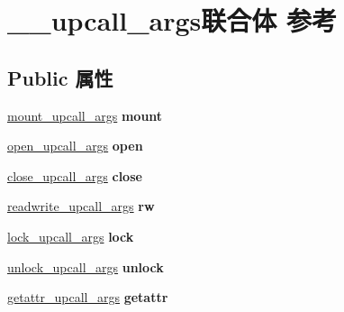 \hypertarget{union____upcall__args}{}\section{\+\_\+\+\_\+upcall\+\_\+args联合体 参考}
\label{union____upcall__args}
\subsection*{Public 属性}
\begin{DoxyCompactItemize}
\item 
\mbox{\label{union____upcall__args_a2414553dc8fd0a868d00a6451d0d7c68}} 
\hyperlink{struct____mount__upcall__args}{mount\+\_\+upcall\+\_\+args} {\bfseries mount}
\item 
\mbox{\label{union____upcall__args_ad844585460bd32cf0da14c0572aa0bca}} 
\hyperlink{struct____open__upcall__args}{open\+\_\+upcall\+\_\+args} {\bfseries open}
\item 
\mbox{\label{union____upcall__args_a05f63c924d970e7110a41bdff53ef81e}} 
\hyperlink{struct____close__upcall__args}{close\+\_\+upcall\+\_\+args} {\bfseries close}
\item 
\mbox{\label{union____upcall__args_a18bfd568832231ee886af7f9cd014c44}} 
\hyperlink{struct____readwrite__upcall__args}{readwrite\+\_\+upcall\+\_\+args} {\bfseries rw}
\item 
\mbox{\label{union____upcall__args_ae180927509f46b0e137bb9825211a4d6}} 
\hyperlink{struct____lock__upcall__args}{lock\+\_\+upcall\+\_\+args} {\bfseries lock}
\item 
\mbox{\label{union____upcall__args_ad6734d97e0e917a8da07f1e27a6f42d7}} 
\hyperlink{struct____unlock__upcall__args}{unlock\+\_\+upcall\+\_\+args} {\bfseries unlock}
\item 
\mbox{\label{union____upcall__args_a761392b85e74c32e1138941d99978eed}} 
\hyperlink{struct____getattr__upcall__args}{getattr\+\_\+upcall\+\_\+args} {\bfseries getattr}
\item 
\mbox{\label{union____upcall__args_a7a2d7fe4fcac3305900b0c78968fca0f}} 

\end{DoxyCompactItemize}
